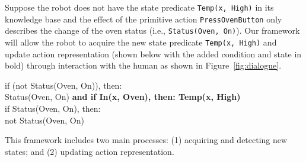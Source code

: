 \documentclass[letterpaper]{article} %
\begin{document}

Suppose the robot does not have the state predicate \texttt{Temp(x, High)} in its knowledge base and the effect of the primitive action \texttt{PressOvenButton} only describes the change of the oven status (i.e., \texttt{Status(Oven, On)}). Our framework will allow the robot to acquire the new state predicate \texttt{Temp(x, High)} and update action representation (shown below with the added condition and state in bold) through interaction with the human as shown in Figure~\ref{fig:dialogue}.  %
\\
\begin{scriptsize}
\indent \indent if (not Status(Oven, On)), then:\\
\indent \indent \indent Status(Oven, On) {\bf and if In(x, Oven), then: {\bf Temp(x, High)}} \\ 
\indent \indent if Status(Oven, On), then:\\
\indent \indent \indent not Status(Oven, On)\\
\end{scriptsize}
This framework includes two main processes: (1) acquiring and detecting new states; and (2) updating action representation.



\end{document}
